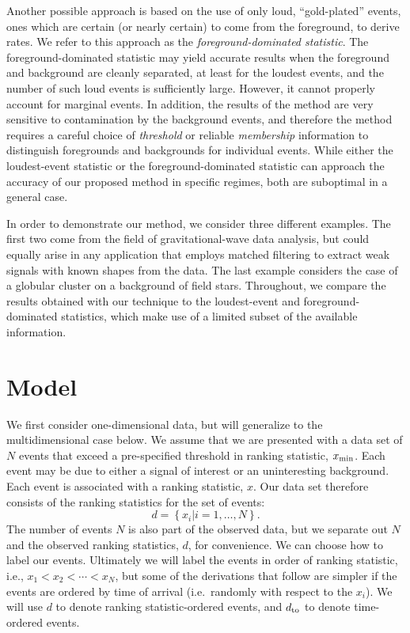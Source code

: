 \documentclass[aps,prd,reprint,nofootinbib]{revtex4-1}
\newcommand{\mathset}[1]{\left\{ #1 \right\}}
\begin{document}
Another possible approach is based on the use of only loud,
``gold-plated'' events, ones which are certain (or nearly certain) to
come from the foreground, to derive rates.  We refer to this approach
as the \emph{foreground-dominated statistic}.  The
foreground-dominated statistic may yield accurate results when the
foreground and background are cleanly separated, at least for the
loudest events, and the number of such loud events is sufficiently
large.  However, it cannot properly account for marginal events.  In
addition, the results of the method are very sensitive to
contamination by the background events, and therefore the method
requires a careful choice of \emph{threshold} or reliable
\emph{membership} information to distinguish foregrounds and
backgrounds for individual events.  While either the loudest-event
statistic or the foreground-dominated statistic can approach the
accuracy of our proposed method in specific regimes, both are
suboptimal in a general case.

In order to demonstrate our method, we consider three different
examples.  The first two come from the field of gravitational-wave
data analysis, but could equally arise in any application that employs
matched filtering \cite{findchirppaper} to extract weak signals with
known shapes from the data.  The last example considers the case of a
globular cluster on a background of field stars.  Throughout, we
compare the results obtained with our technique to the loudest-event
and foreground-dominated statistics, which make use of a limited
subset of the available information.

\section{Model}\label{sec:model}

We first consider one-dimensional data, but will generalize to the
multidimensional case below.  We assume that we are presented with a
data set of $N$ events that exceed a pre-specified threshold in
ranking statistic, $x_{\rm min}$.  Each event may be due to either a
signal of interest or an uninteresting background.  Each event is
associated with a ranking statistic, $x$.  Our data set therefore
consists of the ranking statistics for the set of events:
\begin{equation}
  d = \mathset{ x_i | i = 1, \ldots, N } .
\end{equation}
The number of events $N$ is also part of the observed data, but we
separate out $N$ and the observed ranking statistics, $d$, for
convenience. We can choose how to label our events. Ultimately we will
label the events in order of ranking statistic, i.e., $x_1 < x_2 <
\cdots < x_N$, but some of the derivations that follow are simpler if
the events are ordered by time of arrival (i.e.\ randomly with respect
to the $x_i$). We will use $d$ to denote ranking statistic-ordered
events, and $d_{\rm to}$ to denote time-ordered events.
\end{document}
